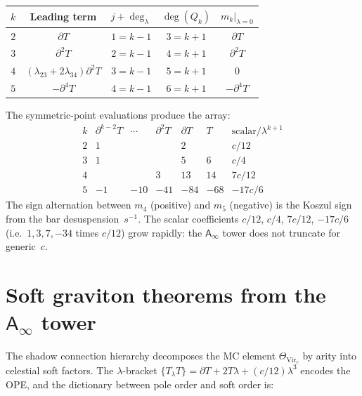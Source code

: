 \documentclass[11pt]{article}
\newcommand{\Ainf}{\mathsf{A}_{\infty}}
\begin{document}
\begin{center}
\small
\renewcommand{\arraystretch}{1.3}
\begin{tabular}{@{}ccccc@{}}
\textbf{$k$}
  & \textbf{Leading term}
  & \textbf{$j + \deg_\lambda$}
  & \textbf{$\deg(Q_k)$}
  & \textbf{$m_k|_{\lambda=0}$} \\
\hline
$2$ & $\partial T$ & $1 = k{-}1$ & $3 = k{+}1$ & $\partial T$ \\
$3$ & $\partial^2 T$ & $2 = k{-}1$ & $4 = k{+}1$ & $\partial^2 T$ \\
$4$ & $(\lambda_{23}{+}2\lambda_{34})\partial^2 T$
    & $3 = k{-}1$ & $5 = k{+}1$ & $0$ \\
$5$ & $-\partial^4 T$ & $4 = k{-}1$ & $6 = k{+}1$ & $-\partial^4 T$
\end{tabular}
\end{center}

\begin{observation}
The symmetric-point evaluations produce the array:
\[
\renewcommand{\arraystretch}{1.2}
\begin{array}{c|cccccc}
k & \partial^{k-2}T & \cdots & \partial^2 T
  & \partial T & T & \text{scalar}/\lambda^{k+1} \\
\hline
2 & 1 & & & 2 & & c/12 \\
3 & 1 & & & 5 & 6 & c/4 \\
4 & & & 3 & 13 & 14 & 7c/12 \\
5 & -1 & -10 & -41 & -84 & -68 & -17c/6
\end{array}
\]
The sign alternation between $m_4$ (positive) and $m_5$ (negative)
is the Koszul sign from the bar desuspension~$s^{-1}$.
The scalar coefficients $c/12$, $c/4$, $7c/12$, $-17c/6$ (i.e.\
$1, 3, 7, -34$ times $c/12$) grow rapidly:
the $\Ainf$ tower does not truncate for generic~$c$.
\end{observation}


\section{Soft graviton theorems from the $\Ainf$ tower}
\label{sec:soft-graviton-ainf}

The shadow connection hierarchy decomposes the MC element
$\Theta_{\mathrm{Vir}_c}$ by arity into celestial soft factors.
The $\lambda$-bracket
$\{T{}_\lambda T\} = \partial T + 2T\lambda + (c/12)\lambda^3$
encodes the OPE, and the dictionary between pole order and soft
order is:
\end{document}
